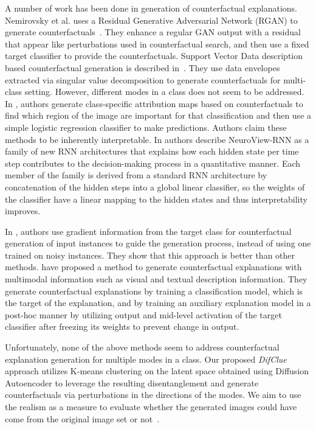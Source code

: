 A number of work has been done in generation of counterfactual explanations. Nemirovsky et al. uses a Residual Generative Adversarial Network (RGAN) to generate counterfactuals~\cite{DBLP:journals/corr/abs-2009-05199}. They enhance a regular GAN output with a residual that appear like perturbations used in counterfactual search, and then use a fixed target classifier to provide the counterfactuals. Support Vector Data description based counterfactual generation is described in~\cite{Carlevaro2023}. They use data envelopes extracted via singular value decomposition to generate counterfactuals for multi-class setting. However, different modes in a class does not seem to be addressed. In \cite{sun2023inherently}, authors generate class-specific attribution maps based on counterfactuals to find which region of the image are important for that classification and then use a simple logistic regression classifier to make predictions. Authors claim these methods to be inherently interpretable. In \cite{barberan2022neuroviewrnn} authors describe NeuroView-RNN as a family of new RNN architectures that explains how each hidden state per time step contributes to the decision-making process in a quantitative manner. Each member of the family is derived from a standard RNN architecture by concatenation of the hidden steps into a global linear classifier, so the weights of the classifier have a linear mapping to the hidden states and thus interpretability improves.

In \cite{jeanneret2022diffusion}, authors use gradient information from the target class for counterfactual generation of input instances to guide the generation process, instead of using one trained on noisy instances. They show that this approach is better than other methods. \cite{kanehira2019multimodal} have  proposed a method to generate counterfactual explanations with multimodal information such as visual and textual description information. They generate counterfactual explanations by training a classification model, which is the target of the explanation, and by training an auxiliary explanation model in a post-hoc manner by utilizing output and mid-level activation of the target classifier after freezing its weights to prevent change in output. 

Unfortunately, none of the above methods seem to address counterfactual explanation generation for multiple modes in a class. Our proposed \textit{DifClue} approach utilizes K-means clustering on the latent space obtained using Diffusion Autoencoder \cite{preechakul2022diffusion} to leverage the resulting disentanglement and generate counterfactuals via perturbations in the directions of the modes. We aim to use the realism as a measure to evaluate whether the generated images could have come from the original image set or not~\cite{DBLP:journals/corr/HeuselRUNKH17}.

